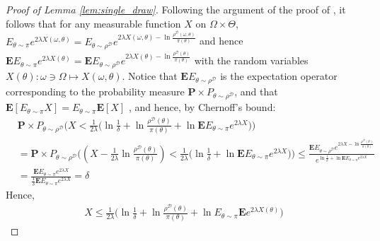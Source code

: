 \documentclass{article}
\newcommand{\train}{\mathcal{D}}
\newcommand{\bP}{\mathbf{P}}
\newcommand{\bE}{\mathbf{E}}
\begin{document}
\begin{proof}[Proof of Lemma \ref{lem:single_draw}]
 Following the argument of the proof of \cite[Theorem 2.7]{alquier2021userfriendly}, it follows
 that for any measurable function
 $X$ on $\Omega \times \Theta$,
 $E_{\theta \sim \pi} e^{2\lambda X(\omega,\theta)} = E_{\theta \sim \rho^{\train}} e^{2\lambda X(\omega,\theta)-\ln \frac{\rho^{\train}(\omega,\theta)}{\pi(\theta)}}$ and hence 
 $\bE E_{\theta \sim \pi} e^{2\lambda X(\theta)}=\bE E_{\theta \sim \rho^{\train}}
 e^{2\lambda X(\theta)-\ln \frac{\rho^{\train}(\theta)}{\pi(\theta)}}$
 with the random variables $X(\theta): \omega \ni \Omega \mapsto X(\omega,\theta)$.
 Notice that $\bE E_{\theta \sim \rho^{\train}}$ is the expectation operator
 corresponding to the probability measure
 $\bP \times P_{\theta \sim \rho^{\train}}$, and that
$\bE[E_{\theta \sim \pi} X]=E_{\theta \sim \pi} \bE[X]$ 
 , and hence, by Chernoff's bound:
 \begin{align*}
     & \bP \times P_{\theta \sim \rho^{\train}}\big (X < \frac{1}{2\lambda}\big(\ln \frac{1}{\delta} +  \ln \frac{\rho^{\train}(\theta)}{\pi(\theta)}+ \ln \bE E_{\theta \sim \pi} e^{2\lambda X}\big)\big) \\
     & = \bP \times P_{\theta \sim \rho^{\train}}\big ((X - \frac{1}{2\lambda} \ln \frac{\rho^{\train}(\theta)}{\pi(\theta)}) <  \frac{1}{2\lambda}\big(\ln \frac{1}{\delta} + \ln \bE E_{\theta \sim \pi} e^{2\lambda X}\big)\big)
     \le \frac{\bE E_{\theta \sim \rho^{\train}} e^{2\lambda X - \ln \frac{\rho^{\train}(\theta)}{\pi(\theta)}}}{e^{\ln \frac{1}{\delta} + \ln \bE E_{\theta \sim \pi} e^{2\lambda X}}} \\
     & =\frac{\bE E_{\theta \sim \pi} e^{2\lambda X}}{\frac{1}{\delta} \bE E_{\theta \sim \pi} e^{2\lambda X}}=\delta
 \end{align*}
 Hence, 
 \begin{equation}
  \label{lem:single_draw:quadratic:pf0}
   \begin{split}
    X \le  \frac{1}{2\lambda}\big (\ln \frac{1}{\delta} +\ln \frac{\rho^{\train}(\theta)}{\pi(\theta)} + \ln E_{\theta \sim \pi} \bE e^{2\lambda X(\theta)}\big)

\end{split}
\end{equation}
\end{proof}
\end{document}

